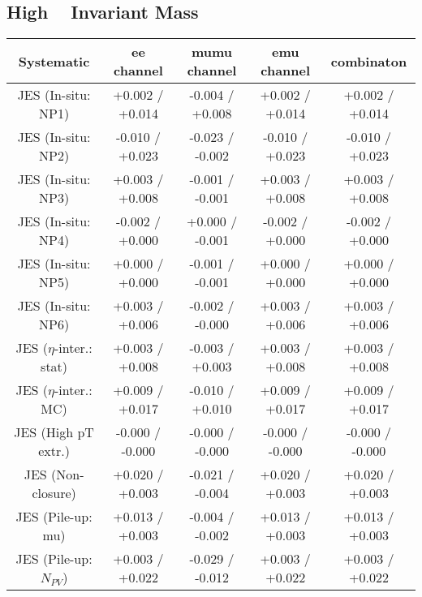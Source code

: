 \subsection{High \ttbar~ Invariant Mass}

 \begin{table}[htbp]
 \scriptsize
   \begin{center}
   \begin{tabular}{|c|c|c|c|c|}
   \hline
 Systematic                            &  ee channel&  mumu channel&  emu channel&  combinaton\\
   \hline
 JES (In-situ: NP1)                    &+0.002   / +0.014   & -0.004   / +0.008   & +0.002   / +0.014   & +0.002   / +0.014  \\
 JES (In-situ: NP2)                    &-0.010   / +0.023   & -0.023   / -0.002   & -0.010   / +0.023   & -0.010   / +0.023  \\
 JES (In-situ: NP3)                    &+0.003   / +0.008   & -0.001   / -0.001   & +0.003   / +0.008   & +0.003   / +0.008  \\
 JES (In-situ: NP4)                    &-0.002   / +0.000   & +0.000   / -0.001   & -0.002   / +0.000   & -0.002   / +0.000  \\
 JES (In-situ: NP5)                    &+0.000   / +0.000   & -0.001   / -0.001   & +0.000   / +0.000   & +0.000   / +0.000  \\
 JES (In-situ: NP6)                    &+0.003   / +0.006   & -0.002   / -0.000   & +0.003   / +0.006   & +0.003   / +0.006  \\
 JES ($\eta$-inter.: stat)             &+0.003   / +0.008   & -0.003   / +0.003   & +0.003   / +0.008   & +0.003   / +0.008  \\
 JES ($\eta$-inter.: MC)               &+0.009   / +0.017   & -0.010   / +0.010   & +0.009   / +0.017   & +0.009   / +0.017  \\
 JES (High pT extr.)                   &-0.000   / -0.000   & -0.000   / -0.000   & -0.000   / -0.000   & -0.000   / -0.000  \\
 JES (Non-closure)                     &+0.020   / +0.003   & -0.021   / -0.004   & +0.020   / +0.003   & +0.020   / +0.003  \\
 JES (Pile-up: mu)                     &+0.013   / +0.003   & -0.004   / -0.002   & +0.013   / +0.003   & +0.013   / +0.003  \\
 JES (Pile-up: $N_{PV}$)               &+0.003   / +0.022   & -0.029   / -0.012   & +0.003   / +0.022   & +0.003   / +0.022  \\

\end{tabular}
\end{center}
\end{table}
